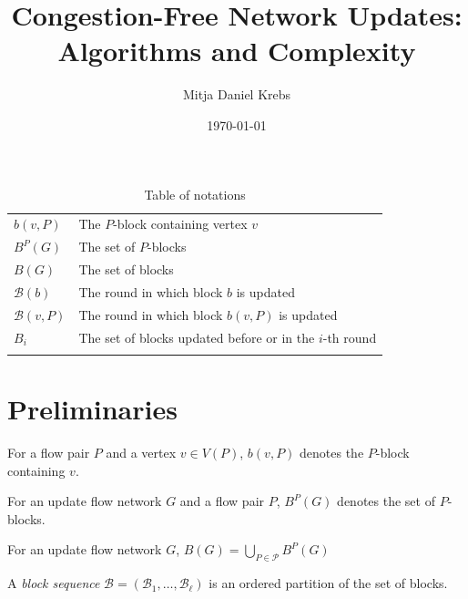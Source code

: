 \documentclass[fontsize=11pt,paper=a4]{book}
\author{Mitja Daniel Krebs}
\date{\today}
\title{Congestion-Free Network Updates: Algorithms and Complexity}
\begin{document}
\maketitle
\tableofcontents

\begin{table}[htbp]
\caption{Table of notations}
\centering
\begin{tabular}{ll}
\hyperref[org5611292]{\(b(v,P)\)} & The \(P\)-block containing vertex \(v\)\\[0pt]
\hyperref[org6e70c40]{\(B^P(G)\)} & The set of \(P\)-blocks\\[0pt]
\hyperref[org2d9ed81]{\(B(G)\)} & The set of blocks\\[0pt]
\hyperref[orge8cadd8]{\(\mathcal{B}(b)\)} & The round in which block \(b\) is updated\\[0pt]
\hyperref[org99dba3a]{\(\mathcal{B}(v,P)\)} & The round in which block \(b(v,P)\) is updated\\[0pt]
\hyperref[org56dcc69]{\(B_i\)} & The set of blocks updated before or in the \(i\)-th round\\[0pt]
 & \\[0pt]
\end{tabular}
\end{table}

\part{Preliminaries}
\label{sec:org8be0682}

\begin{notation}
For a flow pair \(P\) and a vertex \(v\in V(P)\), \(b(v,P)\) denotes the \(P\)-block containing \(v\).
\label{org5611292}
\end{notation}

\begin{notation}
For an update flow network \(G\) and a flow pair \(P\), \(B^P(G)\) denotes the set of \(P\)-blocks.
\label{org6e70c40}
\end{notation}

\begin{notation}
For an update flow network \(G\), \(B(G)=\bigcup_{P\in\mathcal{P}}B^P(G)\)
\label{org2d9ed81}
\end{notation}

\begin{defn}
A \emph{block sequence} \(\mathcal{B}=(\mathscr{B}_1,\dots,\mathscr{B}_{\ell})\) is an ordered partition of the set of blocks.
\label{org85175c2}
\end{defn}
\end{document}
